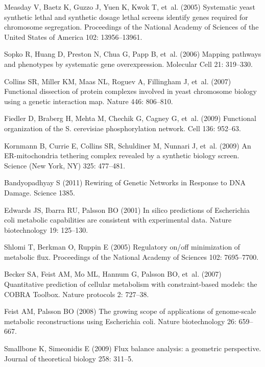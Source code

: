 \documentclass[10pt]{article}
\begin{document}
\begin{thebibliography}{10}
Measday V, Baetz K, Guzzo J, Yuen K, Kwok T, et~al. (2005) {Systematic yeast
  synthetic lethal and synthetic dosage lethal screens identify genes required
  for chromosome segregation.}
\newblock Proceedings of the National Academy of Sciences of the United States
  of America 102: 13956--13961.

Sopko R, Huang D, Preston N, Chua G, Papp B, et~al. (2006) {Mapping pathways
  and phenotypes by systematic gene overexpression}.
\newblock Molecular Cell 21: 319--330.

Collins SR, Miller KM, Maas NL, Roguev A, Fillingham J, et~al. (2007)
  {Functional dissection of protein complexes involved in yeast chromosome
  biology using a genetic interaction map.}
\newblock Nature 446: 806--810.

Fiedler D, Braberg H, Mehta M, Chechik G, Cagney G, et~al. (2009) {Functional
  organization of the S. cerevisiae phosphorylation network.}
\newblock Cell 136: 952--63.

Kornmann B, Currie E, Collins SR, Schuldiner M, Nunnari J, et~al. (2009) {An
  ER-mitochondria tethering complex revealed by a synthetic biology screen.}
\newblock Science (New York, NY) 325: 477--481.

Bandyopadhyay S (2011) {Rewiring of Genetic Networks in Response to DNA
  Damage}.
\newblock Science 1385.

Edwards JS, Ibarra RU, Palsson BO (2001) {In silico predictions of Escherichia
  coli metabolic capabilities are consistent with experimental data.}
\newblock Nature biotechnology 19: 125--130.

Shlomi T, Berkman O, Ruppin E (2005) {Regulatory on/off minimization of
  metabolic flux}.
\newblock Proceedings of the National Academy of Sciences 102: 7695--7700.

Becker SA, Feist AM, Mo ML, Hannum G, Palsson BO, et~al. (2007) {Quantitative
  prediction of cellular metabolism with constraint-based models: the COBRA
  Toolbox.}
\newblock Nature protocols 2: 727--38.

Feist AM, Palsson BO (2008) {The growing scope of applications of genome-scale
  metabolic reconstructions using Escherichia coli.}
\newblock Nature biotechnology 26: 659--667.

Smallbone K, Simeonidis E (2009) {Flux balance analysis: a geometric
  perspective.}
\newblock Journal of theoretical biology 258: 311--5.


\end{thebibliography}
\end{document}
